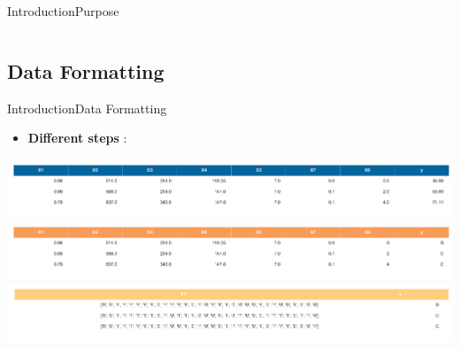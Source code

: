\documentclass[10pt]{beamer}
\begin{document}
\begin{frame}{Introduction}{Purpose}
\begin{itemize}
\begin{columns}[T]
\begin{column}{.48\textwidth}
\begin{minipage}{0.95\linewidth}
        \medskip
    \end{minipage}
\end{column}%
\end{columns}

\end{itemize}
\end{frame}

\subsection{Data Formatting}
\begin{frame}{Introduction}{Data Formatting}
\begin{itemize}
  \item \textbf{Different steps} :
\end{itemize}
    \begin{minipage}{0.95\linewidth}
      \flushleft
      \includegraphics[scale=0.23]{../figures_trabalho_final/step_df.png}
      \includegraphics[scale=0.23]{../figures_trabalho_final/step_df_classif.png}
      \includegraphics[scale=0.23]{../figures_trabalho_final/step_df_bin_classif.png}
      \medskip
    \end{minipage}
\end{frame}

\end{document}
